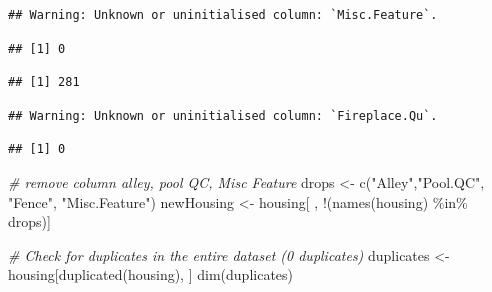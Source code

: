 \documentclass[aoas]{imsart}
\newenvironment{Shaded}{\begin{snugshade}}{\end{snugshade}}
\newcommand{\CommentTok}[1]{\textcolor[rgb]{0.56,0.35,0.01}{\textit{#1}}}
\newcommand{\FunctionTok}[1]{\textcolor[rgb]{0.00,0.00,0.00}{#1}}
\newcommand{\NormalTok}[1]{#1}
\newcommand{\OtherTok}[1]{\textcolor[rgb]{0.56,0.35,0.01}{#1}}
\newcommand{\SpecialCharTok}[1]{\textcolor[rgb]{0.00,0.00,0.00}{#1}}
\newcommand{\StringTok}[1]{\textcolor[rgb]{0.31,0.60,0.02}{#1}}
\numberwithin{equation}{section}
\theoremstyle{plain}
\theoremstyle{remark}
\begin{document}
\begin{verbatim}
## Warning: Unknown or uninitialised column: `Misc.Feature`.
\end{verbatim}

\begin{verbatim}
## [1] 0
\end{verbatim}

\begin{Shaded}
\end{Shaded}

\begin{verbatim}
## [1] 281
\end{verbatim}

\begin{Shaded}
\end{Shaded}

\begin{verbatim}
## Warning: Unknown or uninitialised column: `Fireplace.Qu`.
\end{verbatim}

\begin{verbatim}
## [1] 0
\end{verbatim}

\begin{Shaded}
\begin{Highlighting}[]
\CommentTok{\# remove column alley, pool QC, Misc Feature}
\NormalTok{drops }\OtherTok{\textless{}{-}} \FunctionTok{c}\NormalTok{(}\StringTok{"Alley"}\NormalTok{,}\StringTok{"Pool.QC"}\NormalTok{, }\StringTok{"Fence"}\NormalTok{, }\StringTok{"Misc.Feature"}\NormalTok{)}
\NormalTok{newHousing }\OtherTok{\textless{}{-}}\NormalTok{ housing[ , }\SpecialCharTok{!}\NormalTok{(}\FunctionTok{names}\NormalTok{(housing) }\SpecialCharTok{\%in\%}\NormalTok{ drops)]}

\CommentTok{\# Check for duplicates in the entire dataset (0 duplicates)}
\NormalTok{duplicates }\OtherTok{\textless{}{-}}\NormalTok{ housing[}\FunctionTok{duplicated}\NormalTok{(housing), ]}
\FunctionTok{dim}\NormalTok{(duplicates)}
\end{Highlighting}
\end{Shaded}
\end{document}
